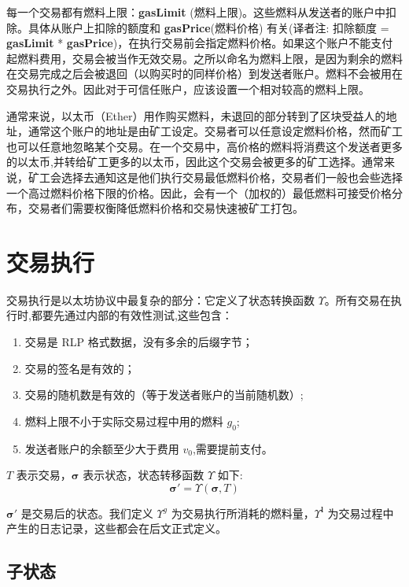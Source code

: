 \documentclass[9pt,oneside]{amsart}
\begin{document}
\begin{multicols}{2}
每一个交易都有燃料上限：\textbf{gasLimit} (燃料上限)。这些燃料从发送者的账户中扣除。具体从账户上扣除的额度和 \textbf{gasPrice}(燃料价格) 有关(译者注: 扣除额度 = \textbf{gasLimit} * \textbf{gasPrice})，在执行交易前会指定燃料价格。如果这个账户不能支付起燃料费用，交易会被当作无效交易。之所以命名为燃料上限，是因为剩余的燃料在交易完成之后会被退回（以购买时的同样价格）到发送者账户。燃料不会被用在交易执行之外。因此对于可信任账户，应该设置一个相对较高的燃料上限。

通常来说，以太币（Ether）用作购买燃料，未退回的部分转到了区块受益人的地址，通常这个账户的地址是由矿工设定。交易者可以任意设定燃料价格，然而矿工也可以任意地忽略某个交易。在一个交易中，高价格的燃料将消费这个发送者更多的以太币,并转给矿工更多的以太币，因此这个交易会被更多的矿工选择。通常来说，矿工会选择去通知这是他们执行交易最低燃料价格，交易者们一般也会些选择一个高过燃料价格下限的价格。因此，会有一个（加权的）最低燃料可接受价格分布，交易者们需要权衡降低燃料价格和交易快速被矿工打包。

\section{交易执行} \label{ch:transactions}

交易执行是以太坊协议中最复杂的部分：它定义了状态转换函数 $\Upsilon$。所有交易在执行时,都要先通过内部的有效性测试,这些包含：
\begin{enumerate}
\item 交易是 RLP 格式数据，没有多余的后缀字节；
\item 交易的签名是有效的；
\item 交易的随机数是有效的（等于发送者账户的当前随机数）;
\item 燃料上限不小于实际交易过程中用的燃料 $g_0$;
\item 发送者账户的余额至少大于费用 $v_0$,需要提前支付。
\end{enumerate}

$T$ 表示交易，$\boldsymbol{\sigma}$ 表示状态，状态转移函数 $\Upsilon$ 如下:
\begin{equation}
\boldsymbol{\sigma}' = \Upsilon(\boldsymbol{\sigma}, T)
\end{equation}

$\boldsymbol{\sigma}'$ 是交易后的状态。我们定义 $\Upsilon^g$ 为交易执行所消耗的燃料量，$\Upsilon^\mathbf{l}$ 为交易过程中产生的日志记录，这些都会在后文正式定义。

\subsection{子状态}


\end{multicols}
\end{document}
